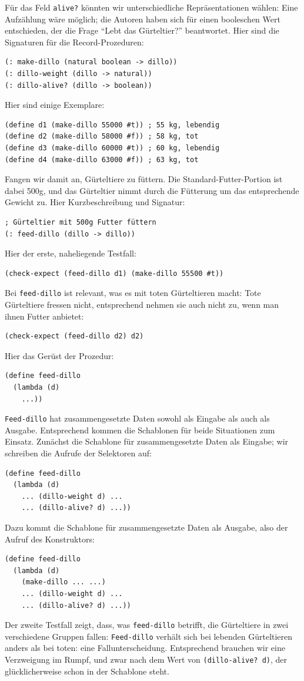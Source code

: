 Für das Feld \texttt{alive?} könnten wir unterschiedliche Repräsentationen
wählen: Eine Aufzählung wäre möglich; die Autoren haben sich für einen
booleschen Wert entschieden, der die Frage "`Lebt das Gürteltier?"'
beantwortet.  Hier sind die Signaturen für die Record-Prozeduren:
%
\begin{verbatim}
(: make-dillo (natural boolean -> dillo))
(: dillo-weight (dillo -> natural))
(: dillo-alive? (dillo -> boolean))
\end{verbatim}
%
Hier sind einige Exemplare:
%
\begin{verbatim}
(define d1 (make-dillo 55000 #t)) ; 55 kg, lebendig 
(define d2 (make-dillo 58000 #f)) ; 58 kg, tot
(define d3 (make-dillo 60000 #t)) ; 60 kg, lebendig
(define d4 (make-dillo 63000 #f)) ; 63 kg, tot
\end{verbatim}
%
Fangen wir damit an, Gürteltiere zu füttern.  Die
Standard-Futter-Portion ist dabei 500g, und das Gürteltier nimmt durch
die Fütterung um das entsprechende Gewicht zu.  Hier Kurzbeschreibung
und Signatur:
%
\begin{verbatim}
; Gürteltier mit 500g Futter füttern
(: feed-dillo (dillo -> dillo))
\end{verbatim}
%
Hier der erste, naheliegende Testfall:
%
\begin{verbatim}
(check-expect (feed-dillo d1) (make-dillo 55500 #t))
\end{verbatim}
%
Bei \texttt{feed-dillo} ist relevant, was es mit toten
Gürteltieren macht: Tote Gürteltiere fressen nicht, entsprechend
nehmen sie auch nicht zu, wenn man ihnen Futter anbietet:
%
\begin{verbatim}
(check-expect (feed-dillo d2) d2)
\end{verbatim}
%
Hier das Gerüst der Prozedur:
\begin{verbatim}
(define feed-dillo
  (lambda (d)
    ...))
\end{verbatim}
%
\texttt{Feed-dillo} hat zusammengesetzte Daten sowohl als Eingabe
als auch als Ausgabe.  Entsprechend kommen die Schablonen für beide
Situationen zum Einsatz.  Zunächst die Schablone für zusammengesetzte
Daten als Eingabe; wir schreiben die Aufrufe der Selektoren auf:
%
\begin{verbatim}
(define feed-dillo
  (lambda (d)
    ... (dillo-weight d) ...
    ... (dillo-alive? d) ...))
\end{verbatim}
%
Dazu kommt die Schablone für zusammengesetzte Daten als Ausgabe, also
der Aufruf des Konstruktors:
%
\begin{verbatim}
(define feed-dillo
  (lambda (d)
    (make-dillo ... ...)
    ... (dillo-weight d) ...
    ... (dillo-alive? d) ...))
\end{verbatim}
%
Der zweite Testfall zeigt, dass, was \texttt{feed-dillo}
betrifft, die Gürteltiere in zwei verschiedene Gruppen fallen:
\texttt{Feed-dillo} verhält sich bei lebenden Gürteltieren anders als
bei toten: eine Fallunterscheidung.  Entsprechend brauchen wir eine
Verzweigung im Rumpf, und zwar nach dem Wert von \texttt{(dillo-alive?
  d)}, der glücklicherweise schon in der Schablone steht.

